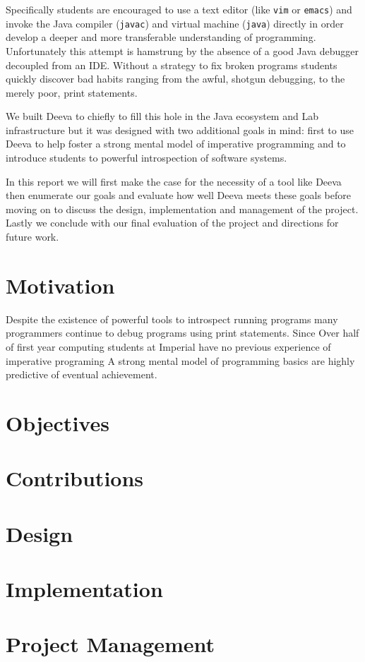 \documentclass[11pt, a4paper]{article}
\newcommand{\cmd}[1]{{\tt #1}}
\begin{document}
Specifically students are encouraged to use a text editor (like \cmd{vim} or \cmd{emacs}) and invoke the Java compiler (\cmd{javac}) and virtual machine (\cmd{java}) directly in order develop a deeper and more transferable understanding of programming.
Unfortunately this attempt is hamstrung by the absence of a good Java debugger decoupled from an IDE.
Without a strategy to fix broken programs students quickly discover bad habits ranging from the awful, shotgun debugging, to the merely poor, print statements.

We built Deeva to chiefly to fill this hole in the Java ecosystem and Lab infrastructure but it was designed with two additional goals in mind:
first to use Deeva to help foster a strong mental model of imperative programming and to introduce students to powerful introspection of software systems.

In this report we will first make the case for the necessity of a tool like Deeva then enumerate our goals and evaluate how well Deeva meets these goals before moving on to discuss the design, implementation and management of the project. 
Lastly we conclude with our final evaluation of the project and directions for future work.

\section{Motivation}
Despite the existence of powerful tools to introspect running programs many programmers continue to debug programs using print statements.
Since 
Over half of first year computing students at Imperial have no previous experience of imperative programing
A strong mental model of programming basics are highly predictive of eventual achievement.

\section{Objectives}
\section{Contributions}
\section{Design}
\section{Implementation}
\section{Project Management}
\end{document}
